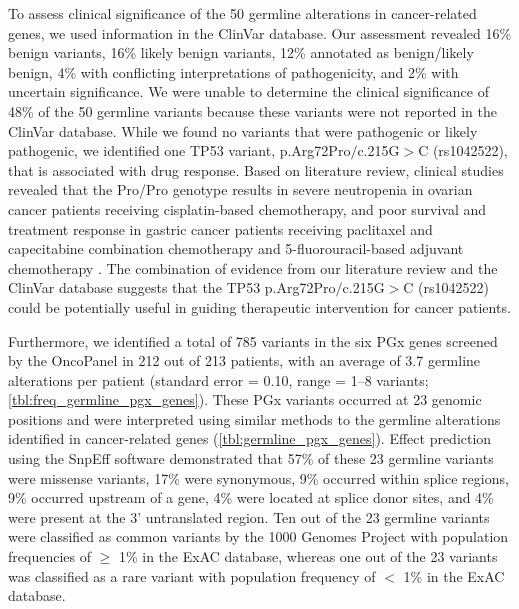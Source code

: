 To assess clinical significance of the 50 germline alterations in cancer-related genes, we used information in the ClinVar database. Our assessment revealed 16\% benign variants, 16\% likely benign variants, 12\% annotated as benign/likely benign, 4\% with conflicting interpretations of pathogenicity, and 2\% with uncertain significance. We were unable to determine the clinical significance of 48\% of the 50 germline variants because these variants were not reported in the ClinVar database. While we found no variants that were pathogenic or likely pathogenic, we identified one \acs{TP53} variant, p.Arg72Pro$/$c.215G$>$C (rs1042522), that is associated with drug response. Based on literature review, clinical studies revealed that the Pro/Pro genotype results in severe neutropenia in ovarian cancer patients receiving cisplatin-based chemotherapy, and poor survival and treatment response in gastric cancer patients receiving paclitaxel and capecitabine combination chemotherapy and 5-fluorouracil-based adjuvant chemotherapy \cite{Khrunin2010, Zha2016, Kim2009, Bojesen2008, Bonafe2004, Huang2008, Yoneda2013, Yang2007, Bougeard2006, Cheng2012, Zhu2007, Zhang2012a}. The combination of evidence from our literature review and the ClinVar database suggests that the \acs{TP53} p.Arg72Pro$/$c.215G$>$C (rs1042522) could be potentially useful in guiding therapeutic intervention for cancer patients.

Furthermore, we identified a total of 785 variants in the six PGx genes screened by the OncoPanel in 212 out of 213 patients, with an average of 3.7 germline alterations per patient (standard error = 0.10, range = 1--8 variants; \autoref{tbl:freq_germline_pgx_genes}). These PGx variants occurred at 23 genomic positions and were interpreted using similar methods to the germline alterations identified in cancer-related genes (\autoref{tbl:germline_pgx_genes}). Effect prediction using the SnpEff software demonstrated that 57\% of these 23 germline variants were missense variants, 17\% were synonymous, 9\% occurred within splice regions, 9\% occurred upstream of a gene, 4\% were located at splice donor sites, and 4\% were present at the 3' untranslated region. Ten out of the 23 germline variants were classified as common variants by the 1000 Genomes Project with population frequencies of $\geq$ 1\% in the ExAC database, whereas one out of the 23 variants was classified as a rare variant with population frequency of $<$ 1\% in the ExAC database.

